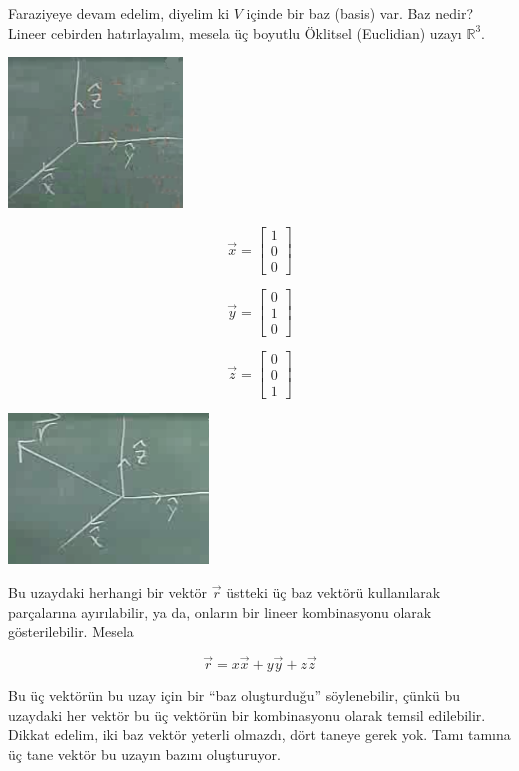 \documentclass[12pt,fleqn]{article}\usepackage{../../common}
\begin{document}
Faraziyeye devam edelim, diyelim ki $V$ içinde bir baz (basis) var. Baz
nedir? Lineer cebirden hatırlayalım, mesela üç boyutlu Öklitsel (Euclidian)
uzayı $\mathbb{R}^3$. 

\includegraphics[height=4cm]{1_6.png}

$$ 
\vec{x} = 
\left[\begin{array}{r}
1 \\ 0 \\ 0
\end{array}\right]
 $$

$$ 
\vec{y} = 
\left[\begin{array}{r}
0 \\ 1 \\ 0
\end{array}\right]
 $$

$$ 
\vec{z} = 
\left[\begin{array}{r}
0 \\ 0 \\ 1
\end{array}\right]
 $$

\includegraphics[height=4cm]{1_7.png}

Bu uzaydaki herhangi bir vektör $\vec{r}$ üstteki üç baz vektörü
kullanılarak parçalarına ayırılabilir, ya da, onların bir lineer
kombinasyonu olarak gösterilebilir. Mesela

$$ \vec{r} = x\vec{x} +  y\vec{y} +  z\vec{z} $$

Bu üç vektörün bu uzay için bir ``baz oluşturduğu'' söylenebilir, çünkü bu
uzaydaki her vektör bu üç vektörün bir kombinasyonu olarak temsil
edilebilir. Dikkat edelim, iki baz vektör yeterli olmazdı, dört taneye
gerek yok. Tamı tamına üç tane vektör bu uzayın bazını oluşturuyor. 
\end{document}
